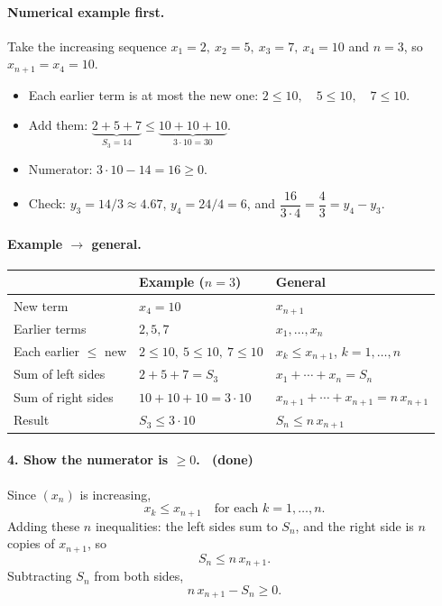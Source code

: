 \documentclass[11pt]{article}
\begin{document}
\paragraph{Numerical example first.} Take the increasing sequence
$x_1=2,\ x_2=5,\ x_3=7,\ x_4=10$ and $n=3$, so $x_{n+1}=x_4=10$.
\begin{itemize}
  \item Each earlier term is at most the new one:
        $2\le 10,\quad 5\le 10,\quad 7\le 10$.
  \item Add them:
        $\underbrace{2+5+7}_{S_3=14} \le \underbrace{10+10+10}_{3\cdot 10=30}$.
  \item Numerator: $3\cdot 10 - 14 = 16 \ge 0$.
  \item Check: $y_3 = 14/3 \approx 4.67$, $y_4 = 24/4 = 6$, and
        $\dfrac{16}{3\cdot 4} = \dfrac43 = y_4 - y_3$. \checkmark
\end{itemize}

\paragraph{Example $\to$ general.}
\begin{center}
\renewcommand{\arraystretch}{1.4}
\begin{tabular}{l|l|l}
  & Example ($n=3$) & General \\ \hline
  New term & $x_4 = 10$ & $x_{n+1}$ \\
  Earlier terms & $2,5,7$ & $x_1,\ldots,x_n$ \\
  Each earlier $\le$ new & $2\le10,\ 5\le10,\ 7\le10$
    & $x_k\le x_{n+1}$, $k=1,\ldots,n$ \\
  Sum of left sides & $2+5+7=S_3$ & $x_1+\cdots+x_n=S_n$ \\
  Sum of right sides & $10+10+10=3\cdot10$
    & $x_{n+1}+\cdots+x_{n+1}=n\,x_{n+1}$ \\
  Result & $S_3\le 3\cdot 10$ & $S_n\le n\,x_{n+1}$
\end{tabular}
\end{center}

\paragraph{4. Show the numerator is $\ge 0$. \checkmark\ (done)}
Since $(x_n)$ is increasing,
\[
  x_k \le x_{n+1} \quad\text{for each } k=1,\ldots,n.
\]
Adding these $n$ inequalities: the left sides sum to $S_n$, and the
right side is $n$ copies of $x_{n+1}$, so
\[
  S_n \le n\,x_{n+1} .
\]
Subtracting $S_n$ from both sides,
\[
  n\,x_{n+1} - S_n \ge 0 .
\]
\end{document}
